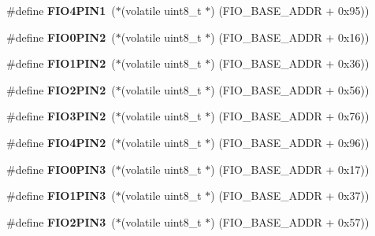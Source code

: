 \begin{DoxyCompactItemize}
\#define {\bfseries F\+I\+O4\+P\+I\+N1}~($\ast$(volatile uint8\+\_\+t $\ast$) (F\+I\+O\+\_\+\+B\+A\+S\+E\+\_\+\+A\+D\+DR + 0x95))
\item 
\mbox{\label{group__lpc24xx__regs_gae4a9055080bd8a0dd9fef4f84655eb1c}} 
\#define {\bfseries F\+I\+O0\+P\+I\+N2}~($\ast$(volatile uint8\+\_\+t $\ast$) (F\+I\+O\+\_\+\+B\+A\+S\+E\+\_\+\+A\+D\+DR + 0x16))
\item 
\mbox{\label{group__lpc24xx__regs_gab21e0d511fd82e21c2b735ad6ec4557f}} 
\#define {\bfseries F\+I\+O1\+P\+I\+N2}~($\ast$(volatile uint8\+\_\+t $\ast$) (F\+I\+O\+\_\+\+B\+A\+S\+E\+\_\+\+A\+D\+DR + 0x36))
\item 
\mbox{\label{group__lpc24xx__regs_ga86df478762c1956caf2a13ca6834a4f3}} 
\#define {\bfseries F\+I\+O2\+P\+I\+N2}~($\ast$(volatile uint8\+\_\+t $\ast$) (F\+I\+O\+\_\+\+B\+A\+S\+E\+\_\+\+A\+D\+DR + 0x56))
\item 
\mbox{\label{group__lpc24xx__regs_ga1d07d582c228fd1a9a59db4ff7a802e9}} 
\#define {\bfseries F\+I\+O3\+P\+I\+N2}~($\ast$(volatile uint8\+\_\+t $\ast$) (F\+I\+O\+\_\+\+B\+A\+S\+E\+\_\+\+A\+D\+DR + 0x76))
\item 
\mbox{\label{group__lpc24xx__regs_gaf28f4e832a2e032c5c33beede185f7d3}} 
\#define {\bfseries F\+I\+O4\+P\+I\+N2}~($\ast$(volatile uint8\+\_\+t $\ast$) (F\+I\+O\+\_\+\+B\+A\+S\+E\+\_\+\+A\+D\+DR + 0x96))
\item 
\mbox{\label{group__lpc24xx__regs_gaac74bc09bb6be50be5a92f37bfaf368d}} 
\#define {\bfseries F\+I\+O0\+P\+I\+N3}~($\ast$(volatile uint8\+\_\+t $\ast$) (F\+I\+O\+\_\+\+B\+A\+S\+E\+\_\+\+A\+D\+DR + 0x17))
\item 
\mbox{\label{group__lpc24xx__regs_ga2909af469021aec1dedf401fb5e897dc}} 
\#define {\bfseries F\+I\+O1\+P\+I\+N3}~($\ast$(volatile uint8\+\_\+t $\ast$) (F\+I\+O\+\_\+\+B\+A\+S\+E\+\_\+\+A\+D\+DR + 0x37))
\item 
\mbox{\label{group__lpc24xx__regs_gab355443de507ee270e170e1638be91a5}} 
\#define {\bfseries F\+I\+O2\+P\+I\+N3}~($\ast$(volatile uint8\+\_\+t $\ast$) (F\+I\+O\+\_\+\+B\+A\+S\+E\+\_\+\+A\+D\+DR + 0x57))

\end{DoxyCompactItemize}
